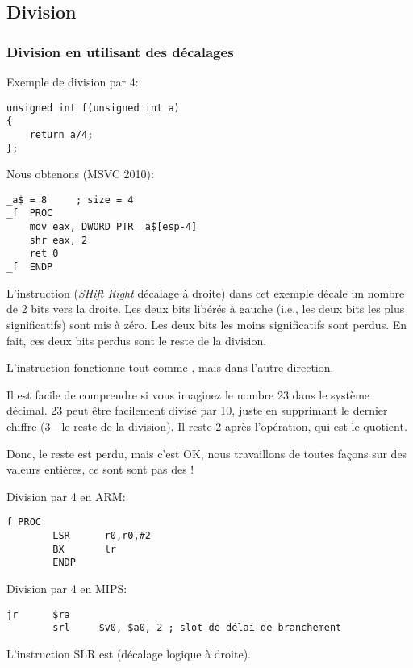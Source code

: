 ﻿\subsection{Division}

\subsubsection{Division en utilisant des décalages}
\label{division_by_shifting}

Exemple de division par 4:

\begin{lstlisting}[style=customc]
unsigned int f(unsigned int a)
{
	return a/4;
};
\end{lstlisting}

Nous obtenons (MSVC 2010):

\begin{lstlisting}[caption=MSVC 2010,style=customasmx86]
_a$ = 8		; size = 4
_f	PROC
	mov	eax, DWORD PTR _a$[esp-4]
	shr	eax, 2
	ret	0
_f	ENDP
\end{lstlisting}

\label{SHR}

L'instruction \SHR (\emph{SHift Right} décalage à droite) dans cet exemple décale un
nombre de 2 bits vers la droite.
Les deux bits libérés à gauche (i.e., les deux bits les plus significatifs) sont
mis à zéro.
Les deux bits les moins significatifs sont perdus.
En fait, ces deux bits perdus sont le reste de la division.


L'instruction \SHR fonctionne tout comme \SHL, mais dans l'autre direction.



Il est facile de comprendre si vous imaginez le nombre 23 dans le système décimal.
23 peut être facilement divisé par 10, juste en supprimant le dernier chiffre (3---le
reste de la division).
Il reste 2 après l'opération, qui est le \gls{quotient}.

Donc, le reste est perdu, mais c'est OK, nous travaillons de toutes façons sur des
valeurs entières, ce sont sont pas des !

Division par 4 en ARM:

\begin{lstlisting}[caption=\NonOptimizingKeilVI (\ARMMode),style=customasmARM]
f PROC
        LSR      r0,r0,#2
        BX       lr
        ENDP
\end{lstlisting}

Division par 4 en MIPS:

\begin{lstlisting}[caption=GCC 4.4.5 \Optimizing (IDA),style=customasmMIPS]
        jr      $ra
        srl     $v0, $a0, 2 ; slot de délai de branchement
\end{lstlisting}

L'instruction SLR est  (décalage logique à droite).
